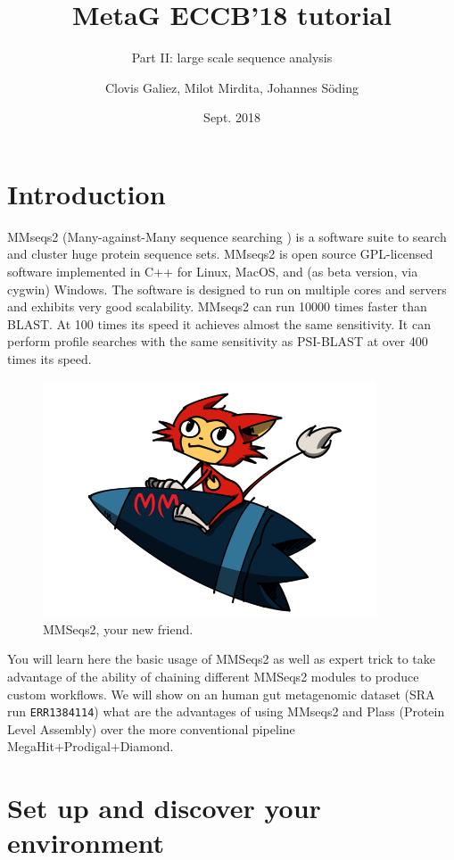 \documentclass{scrartcl}
\title{MetaG ECCB'18 tutorial}
\subtitle{Part II: large scale sequence analysis}
\author{Clovis Galiez, Milot Mirdita, Johannes Söding}
\date{Sept. 2018}
\begin{document}
\maketitle

\section{Introduction}
MMseqs2 (Many-against-Many sequence searching \citep{steinegger2017mmseqs2}) is a software suite to search and cluster huge protein sequence sets. MMseqs2 is open source GPL-licensed software implemented in C++ for Linux, MacOS, and (as beta version, via cygwin) Windows. The software is designed to run on multiple cores and servers and exhibits very good scalability. MMseqs2 can run 10000 times faster than BLAST. At 100 times its speed it achieves almost the same sensitivity. It can perform profile searches with the same sensitivity as PSI-BLAST at over 400 times its speed.

\begin{figure}[h!]
\centering
\includegraphics[height=70mm]{mmseqs2_logo.png}
\caption{MMSeqs2, your new friend.}
\label{fig:universe}
\end{figure}

You will learn here the basic usage of MMSeqs2 as well as expert trick to take advantage of the ability of chaining different MMSeqs2 modules to produce custom workflows. We will show on an human gut metagenomic dataset (SRA run \texttt{ERR1384114}) what are the advantages of using MMseqs2 and Plass (Protein Level Assembly) over the more conventional pipeline MegaHit\citep{li2015megahit}+Prodigal\citep{hyatt2010prodigal}+Diamond.



\section{Set up and discover your environment}
\end{document}
